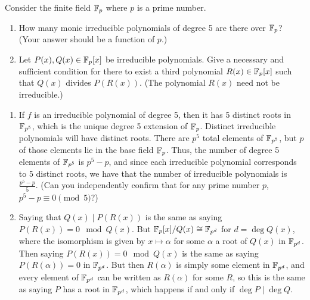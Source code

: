 %
\begin{question}[subtitle = January 2023 Problem 4,ID=Jan23_4]
Consider the finite field $\mathbb{F}_p$ where $p$ is a prime number.
\begin{enumerate}
    \item How many monic irreducible polynomials of degree 5 are there over $\mathbb{F}_p$?  (Your answer should be a function of $p$.)
    \item Let $P(x),Q(x) \in \mathbb{F}_p[x]$ be irreducible polynomials. Give a necessary and sufficient condition for there to exist a third polynomial $R(x) \in \mathbb{F}_p[x]$ such that $Q(x)$ divides $P(R(x))$. (The polynomial $R(x)$ need not be irreducible.)
\end{enumerate}
\end{question}
\begin{solution}
\begin{enumerate}
    \item If $f$ is an irreducible polynomial of degree 5, then it has 5 distinct roots in $\mathbb{F}_{p^5}$, which is the unique degree 5 extension of $\mathbb{F}_p$. Distinct irreducible polynomials will have distinct roots. There are $p^5$ total elements of $\mathbb{F}_{p^5}$, but $p$ of those elements lie in the base field $\mathbb{F}_p$. Thus, the number of degree 5 elements of $\mathbb{F}_{p^5}$ is $p^5-p$, and since each irreducible polynomial corresponds to 5 distinct roots, we have that the number of irreducible polynomials is $\frac{p^5-p}{5}$. (Can you independently confirm that for any prime number $p$, $p^5-p \equiv 0 \pmod{5}$?)
    \item Saying that $Q(x) \mid P(R(x))$ is the same as saying $P(R(x)) = 0 \mod Q(x)$. But $\mathbb{F}_p[x]/Q(x) \cong \mathbb{F}_{p^d}$ for $d = \deg Q(x)$, where the isomorphism is given by $x \mapsto \alpha$ for some $\alpha$ a root of $Q(x)$ in $\mathbb{F}_{p^d}$. Then saying $P(R(x)) = 0 \mod Q(x)$ is the same as saying $P(R(\alpha)) = 0$ in $\mathbb{F}_{p^d}$. But then $R(\alpha)$ is simply some element in $\mathbb{F}_{p^d}$, and every element of $\mathbb{F}_{p^d}$ can be written as $R(\alpha)$ for some $R$, so this is the same as saying $P$ has a root in $\mathbb{F}_{p^d}$, which happens if and only if $\deg P \mid \deg Q$.
\end{enumerate}
\end{solution}

